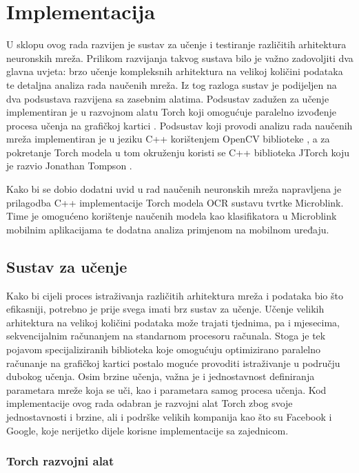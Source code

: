 \documentclass[lmodern, utf8, diplomski, numeric]{fer}
\begin{document}
\chapter{Implementacija}

U sklopu ovog rada razvijen je sustav za učenje i testiranje različitih arhitektura neuronskih mreža. Prilikom razvijanja takvog sustava bilo je važno zadovoljiti dva glavna uvjeta: brzo učenje kompleksnih arhitektura na velikoj količini podataka te detaljna analiza rada naučenih mreža. Iz tog razloga sustav je podijeljen na dva podsustava razvijena sa zasebnim alatima. Podsustav zadužen za učenje implementiran je u razvojnom alatu Torch koji omogućuje paralelno izvođenje procesa učenja na grafičkoj kartici \cite{collobert2011torch}. Podsustav koji provodi analizu rada naučenih mreža implementiran je u jeziku C++ korištenjem OpenCV biblioteke \cite{bradski2000opencv}, a za pokretanje Torch modela u tom okruženju koristi se C++ biblioteka JTorch koju je razvio Jonathan Tompson \cite{tompson2013jtorch}.

Kako bi se dobio dodatni uvid u rad naučenih neuronskih mreža napravljena je prilagodba C++ implementacije Torch modela OCR sustavu tvrtke Microblink. Time je omogućeno korištenje naučenih modela kao klasifikatora u Microblink mobilnim aplikacijama te dodatna analiza primjenom na mobilnom uređaju.

\section{Sustav za učenje}

Kako bi cijeli proces istraživanja različitih arhitektura mreža i podataka bio što efikasniji, potrebno je prije svega imati brz sustav za učenje. Učenje velikih arhitektura na velikoj količini podataka može trajati tjednima, pa i mjesecima, sekvencijalnim računanjem na standarnom procesoru računala. Stoga je tek pojavom specijaliziranih biblioteka koje omogućuju optimizirano paralelno računanje na grafičkoj kartici postalo moguće provoditi istraživanje u području dubokog učenja. 
Osim brzine učenja, važna je i jednostavnost definiranja parametara mreže koja se uči, kao i parametara samog procesa učenja. Kod implementacije ovog rada odabran je razvojni alat Torch zbog svoje jednostavnosti i brzine, ali i podrške velikih kompanija kao što su Facebook i Google, koje nerijetko dijele korisne implementacije sa zajednicom. 

\subsection{Torch razvojni alat}
\end{document}
